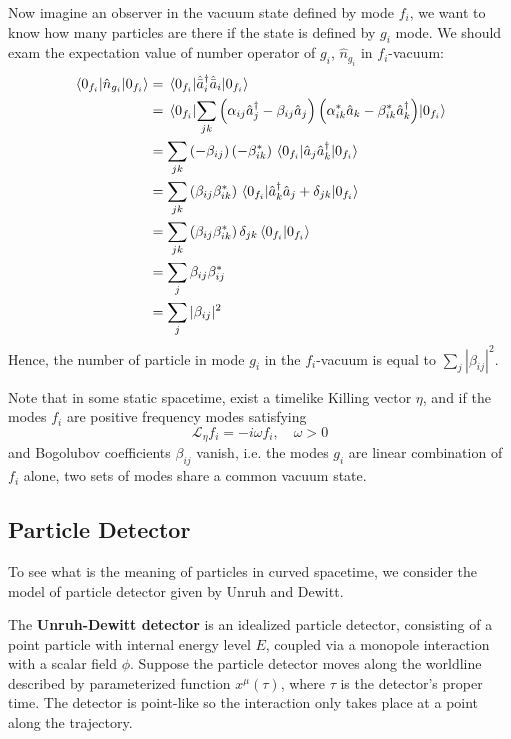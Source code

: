 \documentclass[12pt]{article}
\numberwithin{equation}{subsection}
\theoremstyle{mystyle}{\newtheorem{definition}{Definition}[subsection]}
\theoremstyle{mystyle}{\newtheorem{theorem}[definition]{Theorem}}
\theoremstyle{mystyle}{\newtheorem*{remark}{Remark}}
\theoremstyle{mystyle}{\newtheorem{example}{Example}[subsection]}
\theoremstyle{mystyle}{\newtheorem{examples}{Examples}[subsection]}
\theoremstyle{mystyle}{\newtheorem{cthm}{}[subsection]}
\newcommand{\tbf}[1]{\textbf{#1}}
\begin{document}
Now imagine an observer in the vacuum state defined by mode \(f_i\), we want to know how many particles are there if the state is defined by \(g_i\) mode.
We should exam the expectation value of number operator of \(g_i\), \(\hat{n}_{g_i}\) in \(f_i\)-vacuum:
\begin{align}
  \expval{\hat{n}_{g_i}}{0_{f_i}}&=\expval{\hat{\bar{a}}_i^\dagger \hat{\bar{a}}_i}{0_{f_i}}\\
  &=\expval{\sum_{jk}\left(\alpha_{ij}\hat{a}^{\dagger}_j-\beta_{ij}\hat{a}_j\right)\left(\alpha^*_{ik}\hat{a}_k-\beta^*_{ik}\hat{a}^{\dagger}_k\right)}{0_{f_i}}\\
  &=\sum_{jk}\left(-\beta_{ij}\right)\left(-\beta^*_{ik}\right)\expval{\hat{a}_j\hat{a}^{\dagger}_k}{0_{f_i}}\\
  &=\sum_{jk}\left(\beta_{ij}\beta^*_{ik}\right)\expval{\hat{a}^{\dagger}_k\hat{a}_j+\delta_{jk}}{0_{f_i}}\\
  &=\sum_{jk}\left(\beta_{ij}\beta^*_{ik}\right)\delta_{jk}\braket{0_{f_i}}{0_{f_i}}\\
  &=\sum_{j}\beta_{ij}\beta^*_{ij}\\
  &=\sum_{j}|\beta_{ij}|^2
\end{align}
Hence, the number of particle in mode \(g_i\) in the \(f_i\)-vacuum is equal to \(\sum_{j}|\beta_{ij}|^2\).

Note that in some static spacetime, exist a timelike Killing vector \(\eta\), and if the modes \(f_i\) are positive frequency
modes satisfying
\begin{equation}
  \mathcal{L}_{\eta}f_i=-i\omega f_i,\quad \omega>0
\end{equation}
and Bogolubov coefficients \(\beta_{ij}\) vanish, i.e. the modes \(g_i\) are linear combination of \(f_i\) alone, 
two sets of modes share a common vacuum state.

\newpage

\subsection{Particle Detector}
To see what is the meaning of particles in curved spacetime, we consider the model of particle detector given by Unruh and Dewitt.

The \tbf{Unruh-Dewitt detector} is an idealized particle detector,
consisting of a point particle with internal energy level \(E\),
coupled via a monopole interaction with a scalar field \(\phi\).
Suppose the particle detector moves along the worldline described by parameterized function \(x^\mu(\tau)\),
where \(\tau\) is the detector's proper time.
The detector is point-like so the interaction only takes place at a point along the trajectory.
\end{document}
